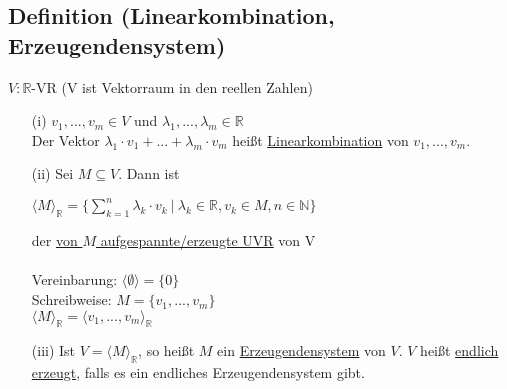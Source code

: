 \documentclass[a4paper, 12pt,titlepage, pdf, headsepline]{scrartcl}
\newcommand{\R}{\mathds{R}}
\newcommand{\uline}[1]{\underline{#1}}
\newcommand*\colvec[1]{
	\global\colveccount#1
	\begin{pmatrix}
		\colvecnext
	}
\def\colvecnext#1{
		#1
		\global\advance\colveccount-1
		\ifnum\colveccount>0
		\\
		\expandafter\colvecnext
		\else
	\end{pmatrix}
	\fi
}
\renewcommand{\>}{\rightarrow}
\renewcommand{\*}{\cdot}
\renewcommand{\vec}[1]{\colvec{#1}}
\begin{document}
\subsection{Definition (Linearkombination, Erzeugendensystem)}
$V: \R$-VR (V ist Vektorraum in den reellen Zahlen) \\
\begin{itemize}
	\item[(i)] $v_1, ... , v_m \in V$ und $\lambda_1,...,\lambda_m \in \R$\\ Der Vektor $\lambda_1 \* v_1 + ... + \lambda_m \* v_m$ heißt \uline{Linearkombination} von $v_1,...,v_m$.
	\item[(ii)] Sei $M \subseteq V$. Dann ist
	      \begin{center}
	      	$\langle M \rangle_{\R} = \big\{ \sum_{k = 1}^{n} \lambda_k \cdot v_k~ \big|~ \lambda_k \in \R, v_k \in M, n \in \mathds{N}\big\}$
	      \end{center}
	      der \underline{von $M$ aufgespannte/erzeugte UVR} von V \\
	      \\
	      Vereinbarung: $\langle \emptyset \rangle = \{0\}$\\
	      Schreibweise: $M = \{v_1,...,v_m\}$\\
	      \noindent\hspace*{22mm}$\langle M \rangle_{\R} = \langle v_1,..., v_m\rangle_{\R} $
	\item[(iii)]
	      Ist $V = \langle M \rangle_{\R}$, so heißt $M$ ein \uline{Erzeugendensystem} von $V$. $V$ heißt \uline{endlich erzeugt}, falls es ein endliches Erzeugendensystem gibt.
\end{itemize}
\end{document}
